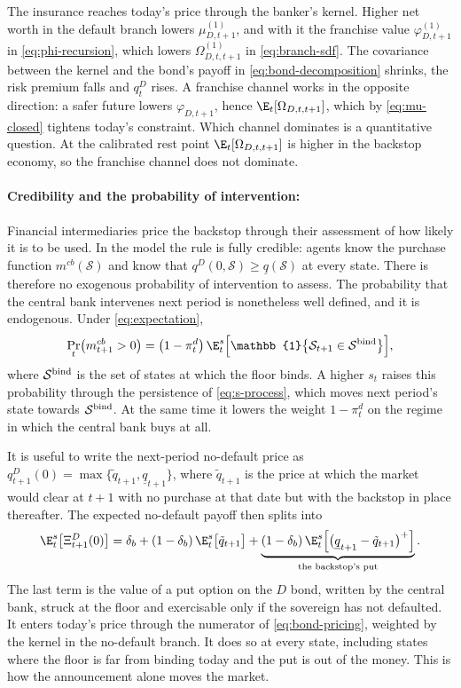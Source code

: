 The insurance reaches today's price through the banker's kernel. Higher net
worth in the default branch lowers $\mu^{(1)}_{D,t+1}$, and with it the franchise
value $\varphi^{(1)}_{D,t+1}$ in \eqref{eq:phi-recursion}, which lowers
$\Omega^{(1)}_{D,t,t+1}$ in \eqref{eq:branch-sdf}. The covariance between the
kernel and the bond's payoff in \eqref{eq:bond-decomposition} shrinks, the risk
premium falls and $q^{D}_t$ rises. A franchise channel works in the opposite
direction: a safer future lowers $\varphi_{D,t+1}$, hence
$\E_t[\Omega_{D,t,t+1}]$, which by \eqref{eq:mu-closed} tightens today's
constraint. Which channel dominates is a quantitative question. At the calibrated
rest point $\E_t[\Omega_{D,t,t+1}]$ is higher in the backstop economy, so the
franchise channel does not dominate.

\paragraph{Credibility and the probability of intervention:}
Financial intermediaries price the backstop through their assessment of how
likely it is to be used. In the model the rule is fully credible: agents know the
purchase function $m^{cb}(\mathcal{S})$ and know that
$q^{D}(0,\mathcal{S})\ge\underline q(\mathcal{S})$ at every state. There is
therefore no exogenous probability of intervention to assess. The probability
that the central bank intervenes next period is nonetheless well defined, and it
is endogenous. Under \eqref{eq:expectation},
\begin{equation}
\Pr_t\bigl(m^{cb}_{t+1}>0\bigr)
=\bigl(1-\pi^{d}_t\bigr)\,
\E^{s}_t\Bigl[\mathbb{1}\bigl\{\mathcal{S}_{t+1}\in\mathcal{S}^{\rm bind}\bigr\}\Bigr],
\label{eq:prob-intervention}
\end{equation}
where $\mathcal{S}^{\rm bind}$ is the set of states at which the floor binds. A
higher $s_t$ raises this probability through the persistence of
\eqref{eq:s-process}, which moves next period's state towards
$\mathcal{S}^{\rm bind}$. At the same time it lowers the weight $1-\pi^{d}_t$ on
the regime in which the central bank buys at all.

It is useful to write the next-period no-default price as
$q^{D}_{t+1}(0)=\max\{\tilde q_{t+1},\underline q_{t+1}\}$, where
$\tilde q_{t+1}$ is the price at which the market would clear at $t+1$ with no
purchase at that date but with the backstop in place thereafter. The expected
no-default payoff then splits into
\begin{equation}
\E^{s}_t\bigl[\Xi^{D}_{t+1}(0)\bigr]
=\delta_b+(1-\delta_b)\,\E^{s}_t\bigl[\tilde q_{t+1}\bigr]
+\underbrace{(1-\delta_b)\,\E^{s}_t\Bigl[\bigl(\underline q_{t+1}-\tilde q_{t+1}\bigr)^{+}\Bigr]}_{\text{the backstop's put}} .
\label{eq:put}
\end{equation}
The last term is the value of a put option on the $D$ bond, written by the
central bank, struck at the floor and exercisable only if the sovereign has not
defaulted. It enters today's price through the numerator of
\eqref{eq:bond-pricing}, weighted by the kernel in the no-default branch. It does
so at every state, including states where the floor is far from binding today and
the put is out of the money. This is how the announcement alone moves the market.

